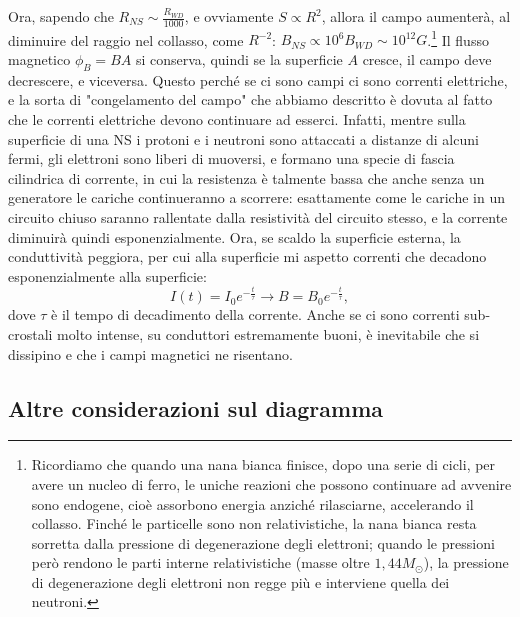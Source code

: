 Ora, sapendo che $R_{NS}\sim \frac{R_{WD}}{1000} $, e ovviamente $S\propto R^2 $, allora il campo aumenterà, al diminuire del raggio nel collasso, come $R^{-2}$: $B_{NS}\propto 10^6B_{WD} \sim 10^{12}G$.\footnote{Ricordiamo che quando una nana bianca finisce, dopo una serie di cicli, per avere un nucleo di ferro, le uniche reazioni che possono continuare ad avvenire sono endogene, cioè assorbono energia anziché rilasciarne, accelerando il collasso.
Finché le particelle sono non relativistiche, la nana bianca resta sorretta dalla pressione di degenerazione degli elettroni; quando le pressioni però rendono le parti interne relativistiche (masse oltre $1,44M_{\odot}$), la pressione di degenerazione degli elettroni non regge più e interviene quella dei neutroni.}
Il flusso magnetico $\phi_B=BA $ si conserva, quindi se la superficie $A$ cresce, il campo deve decrescere, e viceversa.
Questo perché se ci sono campi ci sono correnti elettriche, e la sorta di "congelamento del campo" che abbiamo descritto è dovuta al fatto che le correnti elettriche devono continuare ad esserci. 
Infatti, mentre sulla superficie di una NS i protoni e i neutroni sono attaccati a distanze di alcuni fermi, gli elettroni sono liberi di muoversi, e formano una specie di fascia cilindrica di corrente, in cui la resistenza è talmente bassa che anche senza un generatore le cariche continueranno a scorrere: esattamente come le cariche in un circuito chiuso saranno rallentate dalla resistività del circuito stesso, e la corrente diminuirà quindi esponenzialmente.
Ora, se scaldo la superficie esterna, la conduttività peggiora, per cui alla superficie mi aspetto correnti che decadono esponenzialmente alla superficie:
\begin{equation}
    I(t)=I_0e^{-\frac{t}{\tau}} \xrightarrow{} B=B_0e^{-\frac{t}{\tau}},
    \label{eq: decadimento esponenziale}
\end{equation}
dove $\tau$ è il tempo di decadimento della corrente.
Anche se ci sono correnti sub-crostali molto intense, su conduttori estremamente buoni, è inevitabile che si dissipino e che i campi magnetici ne risentano.

\subsection{Altre considerazioni sul diagramma}

